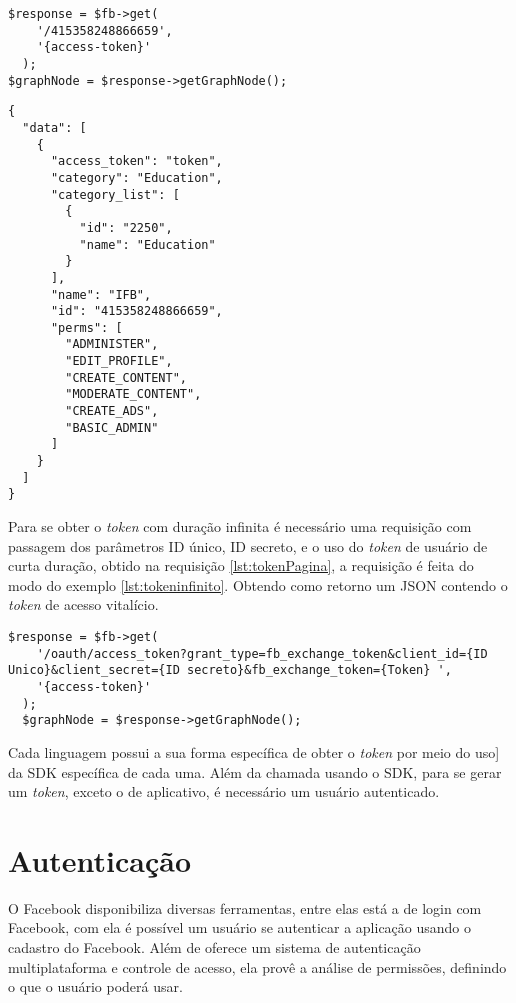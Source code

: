 \begin{lstlisting}[caption={Obtendo Token de uma única página},label={lst:tokenunico}]
  $response = $fb->get(
    '/415358248866659',
    '{access-token}'
  );
$graphNode = $response->getGraphNode();
\end{lstlisting}

\begin{lstlisting}[caption={Retorno \textit{token de acesso de página \ref{lst:tokenPagina}}},label={lst:retornoPagina}]
{
  "data": [
    {
      "access_token": "token",
      "category": "Education",
      "category_list": [
        {
          "id": "2250",
          "name": "Education"
        }
      ],
      "name": "IFB",
      "id": "415358248866659",
      "perms": [
        "ADMINISTER",
        "EDIT_PROFILE",
        "CREATE_CONTENT",
        "MODERATE_CONTENT",
        "CREATE_ADS",
        "BASIC_ADMIN"
      ]
    }
  ]
}
\end{lstlisting}

Para se obter o \textit{token} com duração infinita é necessário uma requisição com passagem dos parâmetros ID único, ID secreto, e o uso do \textit{token} de usuário de curta duração, obtido na requisição \ref{lst:tokenPagina}, a requisição é feita do modo do exemplo \ref{lst:tokeninfinito}. Obtendo como retorno um JSON contendo o \textit{token} de acesso vitalício.

\begin{lstlisting}[caption={Obtendo Token Infinito},label={lst:tokeninfinito}]
  $response = $fb->get(
    '/oauth/access_token?grant_type=fb_exchange_token&client_id={ID Unico}&client_secret={ID secreto}&fb_exchange_token={Token} ',
    '{access-token}'
  );
  $graphNode = $response->getGraphNode();
\end{lstlisting}

Cada linguagem possui a sua forma específica de obter o \textit{token} por meio do uso]	 da SDK específica de cada uma. Além da chamada usando o SDK, para se gerar um \textit{token}, exceto o de aplicativo, é necessário um usuário autenticado.

\section{Autenticação}
O Facebook disponibiliza diversas ferramentas, entre elas está a de login com Facebook, com ela é possível um usuário se autenticar a aplicação usando o cadastro do Facebook. Além de oferece um sistema de autenticação multiplataforma e controle de acesso, ela provê a análise de permissões, definindo o que o usuário poderá usar. \cite{facebook2018c}

